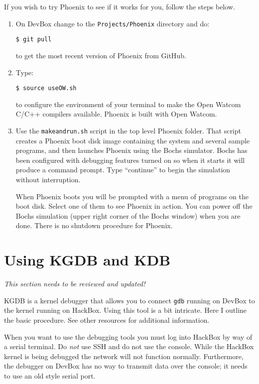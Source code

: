 \documentclass{article}
\newcommand{\command}[1]{\texttt{#1}}
\newcommand{\filename}[1]{\texttt{#1}}
\begin{document}
If you wish to try Phoenix to see if it works for you, follow the steps below.

\begin{enumerate}

\item On DevBox change to the \texttt{Projects/Phoenix} directory and do:
\begin{Verbatim}
$ git pull
\end{Verbatim}
  to get the most recent version of Phoenix from GitHub.

\item Type:
\begin{Verbatim}
$ source useOW.sh
\end{Verbatim}
  to configure the environment of your terminal to make the Open Watcom C/C++ compilers
  available. Phoenix is built with Open Watcom.

\item Use the \filename{makeandrun.sh} script in the top level Phoenix folder. That script
  creates a Phoenix boot disk image containing the system and several sample programs, and then
  launches Phoenix using the Bochs simulator. Bochs has been configured with debugging features
  turned on so when it starts it will produce a command prompt. Type ``continue'' to begin the
  simulation without interruption.

  When Phoenix boots you will be prompted with a menu of programs on the boot disk. Select one
  of them to see Phoenix in action. You can power off the Bochs simulation (upper right corner
  of the Bochs window) when you are done. There is no shutdown procedure for Phoenix.

\end{enumerate}

\section{Using KGDB and KDB}

\textit{This section needs to be reviewed and updated!}

KGDB is a kernel debugger that allows you to connect \command{gdb} running on DevBox to the
kernel running on HackBox. Using this tool is a bit intricate. Here I outline the basic
procedure. See other resources for additional information.

When you want to use the debugging tools you must log into HackBox by way of a serial terminal.
Do \emph{not} use SSH and do not use the console. While the HackBox kernel is being debugged the
network will not function normally. Furthermore, the debugger on DevBox has no way to transmit
data over the console; it needs to use an old style serial port.
\end{document}
